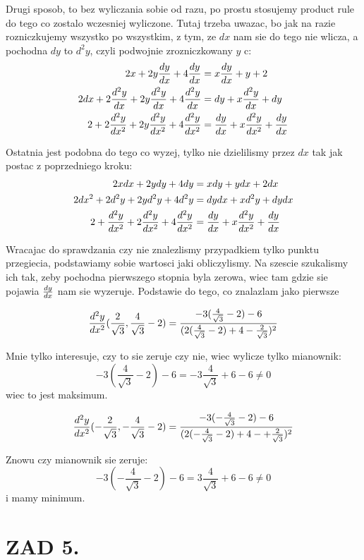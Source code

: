\documentclass{article}[13pt]
\begin{document}
    Drugi sposob, to bez wyliczania sobie od razu, po prostu stosujemy product rule do tego co zostalo wczesniej wyliczone. Tutaj trzeba uwazac, bo jak na razie rozniczkujemy wszystko po wszystkim, z tym, ze $dx$ nam sie do tego nie wlicza, a pochodna $dy$ to $d^2y$, czyli podwojnie zrozniczkowany $y$ c:
    \begin{align*}
        2x+2y{dy\over dx}+4{dy\over dx}&=x{dy\over dx}+y+2\\
        2dx+2{d^2y\over dx}+2y{d^2y\over dx}+4{d^2y\over dx}&=dy+x{d^2y\over dx}+dy\\
        2+2{d^2y\over dx^2}+2y{d^2y\over dx^2}+4{d^2y\over dx^2}&={dy\over dx}+x{d^2y\over dx^2}+{dy\over dx}
    \end{align*}

    Ostatnia jest podobna do tego co wyzej, tylko nie dzielilismy przez $dx$ tak jak postac z poprzedniego kroku:
    \begin{align*}
        2xdx+2ydy+4dy&=xdy+ydx+2dx\\
        2dx^2+2d^2y+2yd^2y+4d^2y&=dydx+xd^2y+dydx\\
        2+{d^2y\over dx^2}+2{d^2y\over dx^2}+4{d^2y\over dx^2}&={dy\over dx}+x{d^2y\over dx^2}+{dy\over dx}
    \end{align*}

    Wracajac do sprawdzania czy nie znalezlismy przypadkiem tylko punktu przegiecia, podstawiamy sobie wartosci jaki obliczylismy. Na szescie szukalismy ich tak, zeby pochodna pierwszego stopnia byla zerowa, wiec tam gdzie sie pojawia ${dy\over dx}$ nam sie wyzeruje. Podstawie do tego, co znalazlam jako pierwsze

    $${d^2y\over dx^2}(\frac2{\sqrt3},\frac4{\sqrt3}-2)={-3(\frac4{\sqrt3} - 2)-6\over (2(\frac4{\sqrt3} - 2) + 4 - \frac2{\sqrt3})^2}$$
    
    Mnie tylko interesuje, czy to sie zeruje czy nie, wiec wylicze tylko mianownik:
    $$-3(\frac4{\sqrt3} - 2)-6=-3\frac4{\sqrt3}+6-6\neq 0$$
    wiec to jest maksimum.

    $${d^2y\over dx^2}(-\frac2{\sqrt3},-\frac4{\sqrt3}-2)={-3(-\frac4{\sqrt3} - 2)-6\over (2(-\frac4{\sqrt3} - 2) + 4 -+\frac2{\sqrt3})^2}$$

    Znowu czy mianownik sie zeruje:
    $$-3(-\frac4{\sqrt3} - 2)-6=3\frac4{\sqrt3} + 6-6\neq 0$$
    i mamy minimum.

    \section*{ZAD 5.}
\end{document}

